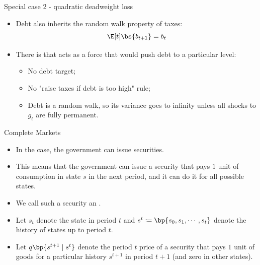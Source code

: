 \documentclass[11pt,xcolor={dvipsnames},hyperref={pdftex,pdfpagemode=UseNone,hidelinks,pdfdisplaydoctitle=true},usepdftitle=false]{beamer}
\begin{document}
    \begin{frame}{Special case 2 - quadratic deadweight loss}
    
        \begin{itemize}
        \item Debt also inherits the random walk property of taxes: \[\E[t]\bs{b_{t+1}}=b_t\]
        \item There is  that acts as a force that would push debt to a particular level:
        \begin{itemize}
            \item No debt target;
            \item No "raise taxes if debt is too high" rule;
            \item Debt is a random walk, so its variance goes to infinity unless all shocks to $g_t$ are fully permanent.
        \end{itemize}
        \end{itemize}
        \end{frame}
    
        \begin{frame}{Complete Markets}
        \begin{itemize}
        \item In the  case, the government can issue  securities.
        \item This means that the government can issue a security that pays $1$ unit of consumption in state $s$ in the next period, and it can do it for all possible states.
        \item We call such a security an .
        \item Let $s_t$ denote the state in period $t$ and $s^t\coloneqq\bp{s_0,s_1,\cdots,s_t}$ denote the history of states up to period $t$.
        \item Let $q\bp{s^{t+1}\mid s^t}$ denote the period $t$ price of a security that pays $1$ unit of goods for a particular history $s^{t+1}$ in period $t+1$ (and zero in other states).
        \end{itemize}
        \end{frame}
\end{document}
